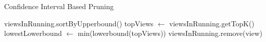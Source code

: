 
\begin{algorithm}
\caption{Confidence Interval Based Pruning}
\label{algo:ci_based_pruning}
\begin{algorithmic}[1]
\State viewsInRunning.sortByUpperbound()
\State topViews $\gets$ viewsInRunning.getTopK()
\State lowestLowerbound $\gets$ min(lowerbound(topViews))
\State viewsInRunning.remove(view)
\EndIf
\EndFor
\end{algorithmic}
\end{algorithm}

